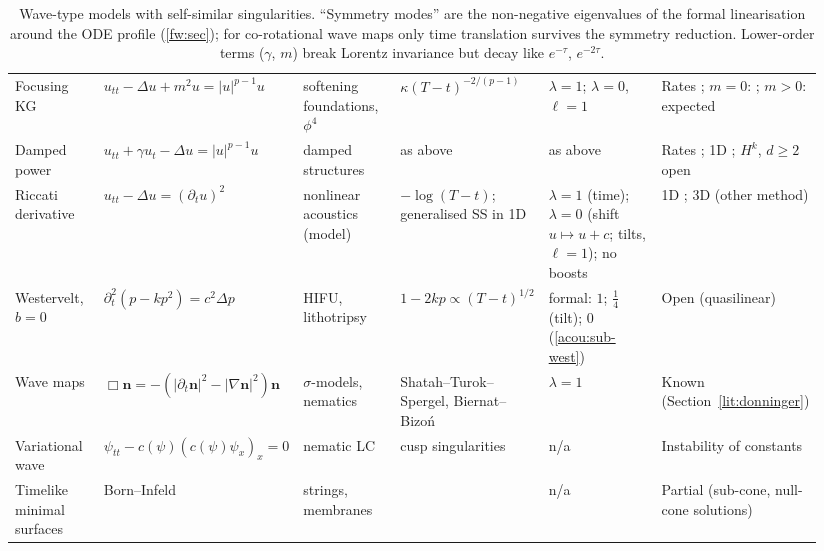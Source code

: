 \begin{table}[htbp]
\begin{tabular}{@{}p{0.11\linewidth}p{0.22\linewidth}p{0.12\linewidth}p{0.17\linewidth}p{0.14\linewidth}p{0.18\linewidth}@{}}
\raggedright Focusing KG & \raggedright $u_{tt}-\Delta u+m^2u=|u|^{p-1}u$ & \raggedright softening foundations, $\phi^4$ & \raggedright $\kappa(T-t)^{-2/(p-1)}$ & \raggedright $\lambda=1$; $\lambda=0$, $\ell=1$ & \raggedright Rates \cite{KillipStovallVisan2014,HamzaZaag2013}; $m=0$: \cite{Ostermann2024}; $m>0$: expected \cite{DonningerWallauch2021} \tabularnewline
\raggedright Damped power & \raggedright $u_{tt}+\gamma u_t-\Delta u=|u|^{p-1}u$ & \raggedright damped structures & \raggedright as above & \raggedright as above & \raggedright Rates \cite{HamzaZaag2010,HamzaZaag2012}; 1D \cite{HamzaSaidi2021}; $H^k$, $d\ge2$ open \tabularnewline
\raggedright Riccati derivative & \raggedright $u_{tt}-\Delta u=(\partial_tu)^2$ & \raggedright nonlinear acoustics (model) & \raggedright $-\log(T-t)$; generalised SS in 1D & \raggedright $\lambda=1$ (time); $\lambda=0$ (shift $u\mapsto u+c$; tilts, $\ell=1$); no boosts & \raggedright 1D \cite{Gough2025,LiuRaees2025}; 3D (other method) \cite{Speck2020} \tabularnewline
\raggedright Westervelt, $b=0$ & \raggedright $\partial_t^2(p-kp^2)=c^2\Delta p$ & \raggedright HIFU, lithotripsy & \raggedright $1-2kp\propto(T-t)^{1/2}$ & \raggedright formal: $1$; $\frac14$ (tilt); $0$ (\cref{acou:sub-west}) & \raggedright Open (quasilinear) \tabularnewline
\raggedright Wave maps & \raggedright $\Box\boldsymbol n=-(|\partial_t\boldsymbol n|^2-|\nabla\boldsymbol n|^2)\boldsymbol n$ & \raggedright $\sigma$-models, nematics & \raggedright Shatah--Turok--Spergel, Biernat--Bizo\'n & \raggedright $\lambda=1$ & \raggedright Known (Section~\ref{lit:donninger}) \tabularnewline
\raggedright Variational wave & \raggedright $\psi_{tt}-c(\psi)(c(\psi)\psi_x)_x=0$ & \raggedright nematic LC & \raggedright cusp singularities & \raggedright n/a & \raggedright Instability of constants \cite{GlasseyHunterZheng1996} \tabularnewline
\raggedright Timelike minimal surfaces & \raggedright Born--Infeld & \raggedright strings, membranes & \raggedright \cite{EggersHoppe2009,EggersEtAl2015} & \raggedright n/a & \raggedright Partial (sub-cone, null-cone solutions) \cite{Yan2019b} \tabularnewline
\bottomrule
\end{tabular}
\caption{Wave-type models with self-similar singularities. ``Symmetry modes''
are the non-negative eigenvalues of the formal linearisation around the
ODE profile (\cref{fw:sec}); for co-rotational wave maps only time
translation survives the symmetry reduction. Lower-order terms ($\gamma$,
$m$) break Lorentz invariance but decay like $e^{-\tau}$, $e^{-2\tau}$.}
\label{lit:tab:summary}
\end{table}

